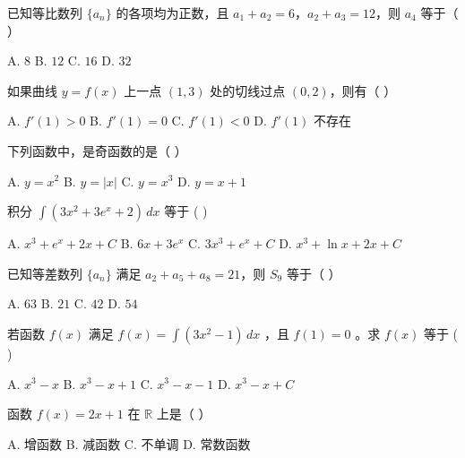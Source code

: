 \documentclass[11pt, a4paper]{article}
\begin{document}
\begin{baitap}[15]
已知等比数列 $\{a_n\}$ 的各项均为正数，且 $a_1 + a_2 = 6$，$a_2 + a_3 = 12$，则 $a_4$ 等于（ ）
\par\vspace{3pt}
\noindent A. $8$ \quad B. $12$ \quad C. $16$ \quad D. $32$
\end{baitap}

\begin{baitap}[16]
如果曲线 $y = f(x)$ 上一点 $(1, 3)$ 处的切线过点 $(0, 2)$，则有（ ）
\par\vspace{3pt}
\noindent A. $f'(1) > 0$ \quad B. $f'(1) = 0$ \quad C. $f'(1) < 0$ \quad D. $f'(1)$ 不存在
\end{baitap}

\begin{baitap}[17]
下列函数中，是奇函数的是（ ）
\par\vspace{3pt}
\noindent A. $y = x^2$ \quad B. $y = |x|$ \quad C. $y = x^3$ \quad D. $y = x + 1$
\end{baitap}

\begin{baitap}[18]
积分 $\int (3x^2 + 3e^x + 2)\,dx$ 等于 ( )
\par\vspace{3pt}
\noindent A. $x^3 + e^x + 2x + C$ \quad B. $6x + 3e^x$ \quad C. $3x^3 + e^x + C$ \quad D. $x^3 + \ln x + 2x + C$
\end{baitap}

\begin{baitap}[19]
已知等差数列 $\{a_n\}$ 满足 $a_2 + a_5 + a_8 = 21$，则 $S_9$ 等于（ ）
\par\vspace{3pt}
\noindent A. $63$ \quad B. $21$ \quad C. $42$ \quad D. $54$
\end{baitap}

\begin{baitap}[20]
若函数 $f(x)$ 满足 $f(x) = \int (3x^2 - 1)\,dx$ ，且 $f(1) = 0$ 。求 $f(x)$ 等于 ( )
\par\vspace{3pt}
\noindent A. $x^3 - x$ \quad B. $x^3 - x + 1$ \quad C. $x^3 - x - 1$ \quad D. $x^3 - x + C$
\end{baitap}

\begin{baitap}[21]
函数 $f(x) = 2x + 1$ 在 $\mathbb{R}$ 上是（ ）
\par\vspace{3pt}
\noindent A. 增函数 \quad B. 减函数 \quad C. 不单调 \quad D. 常数函数
\end{baitap}
\end{document}
